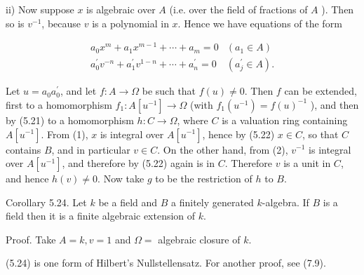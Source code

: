 \documentclass{standalone}
\theoremstyle{definition}
\theoremstyle{remark}
\begin{document}
ii) Now suppose $x$ is algebraic over $A$ (i.e. over the field of fractions of $A$ ). Then so is $v^{-1}$, because $v$ is a polynomial in $x$. Hence we have equations of the form

\[
\begin{array}{ll}
a_{0} x^{m}+a_{1} x^{m-1}+\cdots+a_{m}=0 & \left(a_{1} \in A\right) \\
a_{0}^{\prime} v^{-n}+a_{1}^{\prime} v^{1-n}+\cdots+a_{n}^{\prime}=0 & \left(a_{j}^{\prime} \in A\right) .
\end{array}
\]

Let $u=a_{0} a_{0}^{\prime}$, and let $f: A \rightarrow \Omega$ be such that $f(u) \neq 0$. Then $f$ can be extended, first to a homomorphism $f_{1}: A\left[u^{-1}\right] \rightarrow \Omega$ (with $f_{1}\left(u^{-1}\right)=f(u)^{-1}$ ), and then by (5.21) to a homomorphism $h: C \rightarrow \Omega$, where $C$ is a valuation ring containing $A\left[u^{-1}\right]$. From (1), $x$ is integral over $A\left[u^{-1}\right]$, hence by (5.22) $x \in C$, so that $C$ contains $B$, and in particular $v \in C$. On the other hand, from (2), $v^{-1}$ is integral over $A\left[u^{-1}\right]$, and therefore by (5.22) again is in $C$. Therefore $v$ is a unit in $C$, and hence $h(v) \neq 0$. Now take $g$ to be the restriction of $h$ to $B$.

Corollary 5.24. Let $k$ be a field and $B$ a finitely generated $k$-algebra. If $B$ is a field then it is a finite algebraic extension of $k$.

Proof. Take $A=k, v=1$ and $\Omega=$ algebraic closure of $k$.

(5.24) is one form of Hilbert's Nullstellensatz. For another proof, see (7.9).
\end{document}

